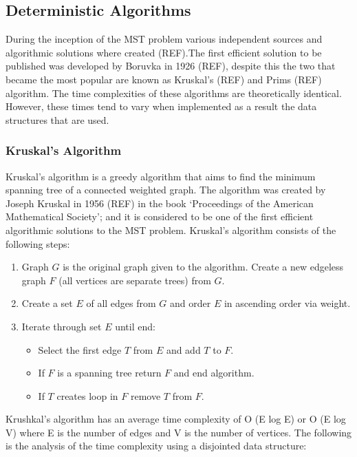 \documentclass{AISB2008}
\begin{document}
\subsection{Deterministic Algorithms}

During the inception of the MST problem various independent sources and algorithmic solutions where created (REF).The first efficient solution to be published was developed by Boruvka in 1926 (REF), despite this the two that became the most popular are known as Kruskal’s (REF) and Prims (REF) algorithm. The time complexities of these algorithms are theoretically identical. However, these times tend to vary when implemented as a result the data structures that are used.


\subsubsection{Kruskal's Algorithm}

Kruskal’s algorithm is a greedy algorithm that aims to find the minimum spanning tree of a connected weighted graph. The algorithm was created by Joseph Kruskal in 1956 (REF) in the book ‘Proceedings of the American Mathematical Society’; and it is considered to be one of the first efficient algorithmic solutions to the MST problem.
Kruskal’s algorithm consists of the following steps:

\begin{enumerate}
\item Graph {$G$} is the original graph given to the algorithm. Create a new edgeless graph {$F$} (all vertices are separate trees) from {$G$}.
\item Create a set {$E$} of all edges from {$G$} and order {$E$} in ascending order via weight.
\item Iterate through set {$E$} until end:
\begin{itemize}
\item Select the first edge {$T$} from {$E$} and add {$T$} to {$F$}.
\item If {$F$} is a spanning tree return {$F$} and end algorithm.
\item If {$T$} creates loop in {$F$} remove {$T$} from {$F$}.
\end{itemize}
\end{enumerate}

Krushkal’s algorithm has an average time complexity of O (E log E) or O (E log V) where E is the number of edges and V is the number of vertices. The following is the analysis of the time complexity using a disjointed data structure:
\end{document}
